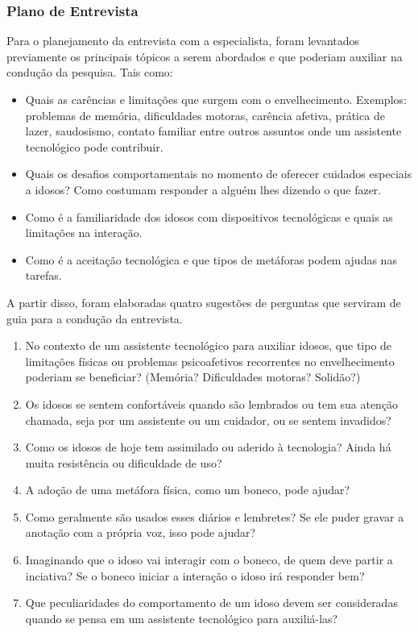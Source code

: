 \subsubsection{Plano de Entrevista} \label{plano_de_entrevista}

Para o planejamento da entrevista com a especialista, foram levantados previamente os principais tópicos a serem abordados e que poderiam auxiliar na condução da pesquisa. Tais como:

\begin{itemize}
    \item Quais as carências e limitações que surgem com o envelhecimento. Exemplos: problemas de memória, dificuldades motoras, carência afetiva, prática de lazer, saudosismo, contato familiar entre outros assuntos onde um assistente tecnológico pode contribuir.
    \item Quais os desafios comportamentais no momento de oferecer cuidados especiais a idosos? Como costumam responder a alguém lhes dizendo o que fazer.
    \item Como é a familiaridade dos idosos com dispositivos tecnológicas e quais as limitações na interação.
    \item Como é a aceitação tecnológica e que tipos de metáforas podem ajudas nas tarefas.
\end{itemize}

A partir disso, foram elaboradas quatro sugestões de perguntas que serviram de guia para a condução da entrevista. 

\begin{enumerate}
    \item No contexto de um assistente tecnológico para auxiliar idosos, que tipo de limitações físicas ou problemas psicoafetivos recorrentes no envelhecimento poderiam se beneficiar? (Memória? Dificuldades motoras? Solidão?)
    \item Os idosos se sentem confortáveis quando são lembrados ou tem sua atenção chamada, seja por um assistente ou um cuidador, ou se sentem invadidos?
    \item Como os idosos de hoje tem assimilado ou aderido à tecnologia?  Ainda há muita resistência ou dificuldade de uso?
    \item A adoção de uma metáfora física, como um boneco, pode ajudar?
    \item Como geralmente são usados esses diários e lembretes? Se ele puder gravar a anotação com a própria voz, isso pode ajudar?
    \item Imaginando que o idoso vai interagir com o boneco, de quem deve partir a inciativa? Se o boneco iniciar a interação o idoso irá responder bem?
    \item Que peculiaridades do comportamento de um idoso devem ser consideradas quando se pensa em um assistente tecnológico para auxiliá-las?
\end{enumerate}

